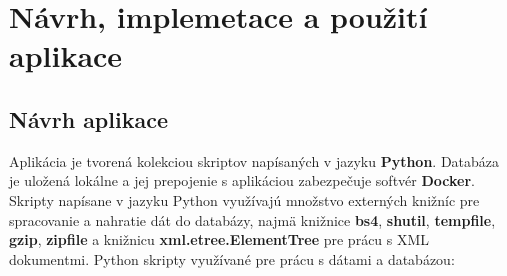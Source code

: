 \documentclass[10pt,xcolor=pdflatex,dvipsnames,table,oneside]{book}
\begin{document}


\part{Návrh, implemetace a použití aplikace}

\chapter{Návrh aplikace}
\par Aplikácia je tvorená kolekciou skriptov napísaných v jazyku \textbf{Python}. Databáza je uložená lokálne a jej prepojenie s aplikáciou zabezpečuje softvér \textbf{Docker}. Skripty napísane v jazyku Python využívajú množstvo externých knižníc pre spracovanie a nahratie dát do databázy, najmä knižnice \textbf{bs4}, \textbf{shutil}, \textbf{tempfile}, \textbf{gzip}, \textbf{zipfile} a knižnicu \textbf{xml.etree.ElementTree} pre prácu s XML dokumentmi. 
\newline
\newline
Python skripty využívané pre prácu s dátami a databázou:
\end{document}
